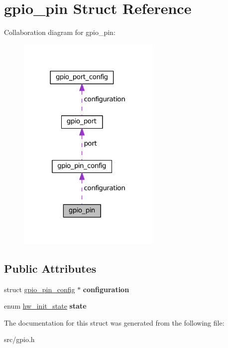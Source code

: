 \hypertarget{structgpio__pin}{}\section{gpio\+\_\+pin Struct Reference}
\label{structgpio__pin}


Collaboration diagram for gpio\+\_\+pin\+:\nopagebreak
\begin{figure}[H]
\begin{center}
\leavevmode
\includegraphics[width=194pt]{structgpio__pin__coll__graph}
\end{center}
\end{figure}
\subsection*{Public Attributes}
\begin{DoxyCompactItemize}
\item 
\hypertarget{structgpio__pin_acb6a2426999aa0f3e40d37a02f791e75}{}struct \hyperlink{structgpio__pin__config}{gpio\+\_\+pin\+\_\+config} $\ast$ {\bfseries configuration}\label{structgpio__pin_acb6a2426999aa0f3e40d37a02f791e75}

\item 
\hypertarget{structgpio__pin_a4d4c7f491d051331985524f88f81fa58}{}enum \hyperlink{hw_8h_a3c02952100e7d051b77cdf060ca0ba9b}{hw\+\_\+init\+\_\+state} {\bfseries state}\label{structgpio__pin_a4d4c7f491d051331985524f88f81fa58}

\end{DoxyCompactItemize}


The documentation for this struct was generated from the following file\+:\begin{DoxyCompactItemize}
\item 
src/gpio.\+h\end{DoxyCompactItemize}
